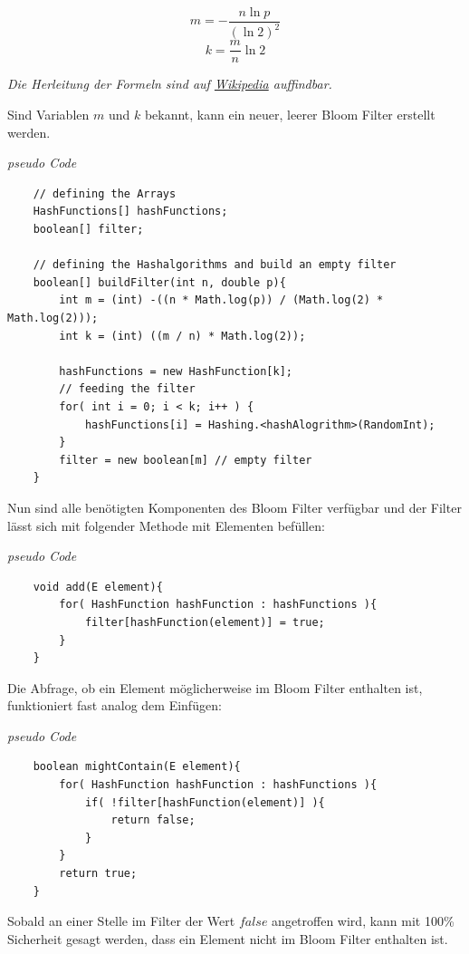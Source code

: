 \documentclass{article}
\begin{document}
    \begin{equation}
        m = -\frac{n \ln{p}}{(\ln{2})^2}
    \end{equation}
    \begin{equation}
        k = \frac{m}{n} \ln{2}
    \end{equation}
    \begin{center}
        \textit{Die Herleitung der Formeln sind auf \href{https://en.wikipedia.org/wiki/Bloom_filter\#Optimal_number_of_hash_functions}{Wikipedia} auffindbar.}
    \end{center}
    Sind Variablen $m$ und $k$ bekannt, kann ein neuer, leerer Bloom Filter erstellt werden.
    \begin{center}
        \textit{pseudo Code}
    \end{center}
    \begin{lstlisting}
    // defining the Arrays
    HashFunctions[] hashFunctions;
    boolean[] filter;

    // defining the Hashalgorithms and build an empty filter
    boolean[] buildFilter(int n, double p){
        int m = (int) -((n * Math.log(p)) / (Math.log(2) * Math.log(2)));
        int k = (int) ((m / n) * Math.log(2));

        hashFunctions = new HashFunction[k];
        // feeding the filter
        for( int i = 0; i < k; i++ ) {
            hashFunctions[i] = Hashing.<hashAlogrithm>(RandomInt);
        }
        filter = new boolean[m] // empty filter
    }
    \end{lstlisting}
    Nun sind alle benötigten Komponenten des Bloom Filter verfügbar und der Filter lässt sich mit folgender Methode mit Elementen befüllen:
    \begin{center}
        \textit{pseudo Code}
    \end{center}
    \begin{lstlisting}
    void add(E element){
        for( HashFunction hashFunction : hashFunctions ){
            filter[hashFunction(element)] = true;
        }
    }
    \end{lstlisting}
    Die Abfrage, ob ein Element möglicherweise im Bloom Filter enthalten ist, funktioniert fast analog dem Einfügen:
    \begin{center}
        \textit{pseudo Code}
    \end{center}
    \begin{lstlisting}
    boolean mightContain(E element){
        for( HashFunction hashFunction : hashFunctions ){
            if( !filter[hashFunction(element)] ){
                return false;
            }
        }
        return true;
    }
    \end{lstlisting}
    Sobald an einer Stelle im Filter der Wert $false$ angetroffen wird, kann mit 100\% Sicherheit gesagt werden, dass ein Element nicht im Bloom Filter enthalten ist.
\end{document}
